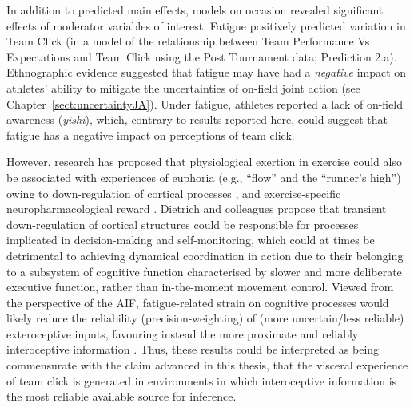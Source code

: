 \begin{CJK}{UTF8}{gbsn}
In addition to predicted main effects, models on occasion revealed significant effects of moderator variables of interest.  Fatigue positively predicted variation in Team Click (in a model of the relationship between Team Performance Vs Expectations and Team Click using the Post Tournament data; Prediction 2.a).  Ethnographic evidence suggested that fatigue may have had a \textit{negative} impact on athletes' ability to mitigate the uncertainties of on-field joint action (see Chapter~\ref{sect:uncertaintyJA}).  Under fatigue, athletes reported a lack of on-field awareness (\textit{yishi}), which, contrary to results reported here, could suggest that fatigue has a negative impact on perceptions of team click.

However, research has proposed that physiological exertion in exercise could also be associated with experiences of euphoria (e.g., ``flow'' and the ``runner's high'') owing to down-regulation of cortical processes \citep{Dietrich2011}, and exercise-specific neuropharmacological reward \citep{Raichlen2008}.  Dietrich and colleagues propose that transient down-regulation of cortical structures could be responsible for processes implicated in decision-making and self-monitoring, which could at times be detrimental to achieving dynamical coordination in action due to their belonging to a subsystem of cognitive function \citep[i.e., a deliberate ``system 2'' as opposed to more automatic and implicit ``system 1''; see ][]{Kahneman2011} characterised by slower and more deliberate executive function, rather than in-the-moment movement control.  Viewed from the perspective of the AIF, fatigue-related strain on cognitive processes would likely reduce the reliability (precision-weighting) of (more uncertain/less reliable) exteroceptive inputs, favouring instead the more proximate and reliably interoceptive information \citep{Pezullo2014,Barret2017}.  Thus, these results could be interpreted as being commensurate with the claim advanced in this thesis, that the visceral experience of team click is generated in environments in which interoceptive information is the most reliable available source for inference.


\end{CJK}
